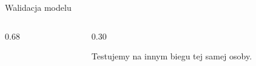 \begin{frame}{Walidacja modelu}
\begin{columns}[T,onlytextwidth]
\begin{column}{0.68\textwidth}
\vspace{4pt}
\end{column}
\begin{column}{0.30\textwidth}
\centering{}\par\vspace{3pt}
{\fontsize{10}{12}\selectfont Testujemy na innym biegu tej samej osoby.}
\end{column}
\end{columns}
\end{frame}
